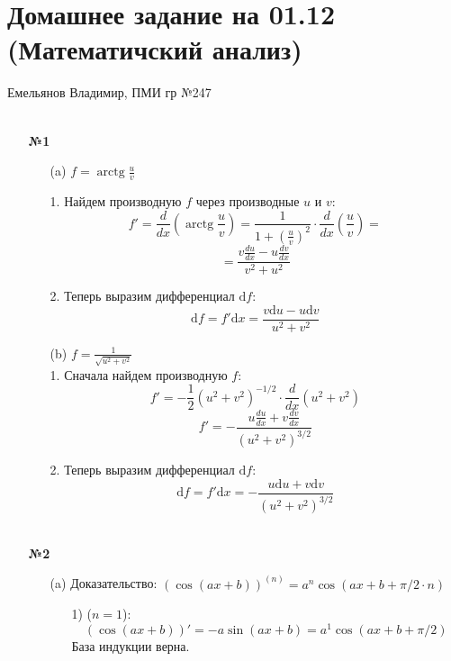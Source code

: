 \documentclass[a4paper]{article}
\begin{document}
\section*{Домашнее задание на 01.12 (Математичский анализ)}
 {\large Емельянов Владимир, ПМИ гр №247}\\\\
\begin{enumerate}
    \item[\textbf{№1}]
    \begin{enumerate}
        \item[(a)] $ f = \operatorname{arctg} \frac{u}{v} $\\
        \item[] 
        1. Найдем производную $ f $ через производные $u$ и $v$:
        $$
        f' = \frac{d}{dx} \left( \operatorname{arctg} \frac{u}{v} \right) = \frac{1}{1 + \left( \frac{u}{v} \right)^2} \cdot \frac{d}{dx} \left( \frac{u}{v} \right) =
        $$
        $$=\frac{v \frac{du}{dx} - u \frac{dv}{dx}}{v^2 + u^2}$$

        2. Теперь выразим дифференциал $ \mathrm{d}f $:
        $$
        \mathrm{d}f = f' \mathrm{d}x = \frac{v \mathrm{d}u - u \mathrm{d}v}{u^2 + v^2}
        $$

        \item[(b)]  $ f = \frac{1}{\sqrt{u^2 + v^2}} $ \\
    
        1. Сначала найдем производную $ f $:
        $$
        f' = -\frac{1}{2} (u^2 + v^2)^{-1/2} \cdot \frac{d}{dx}(u^2 + v^2)
        $$
        $$
        f' = -\frac{u \frac{du}{dx} + v \frac{dv}{dx}}{(u^2 + v^2)^{3/2}}
        $$

        
        2. Теперь выразим дифференциал $ \mathrm{d}f $:
        $$
        \mathrm{d}f = f' \mathrm{d}x = -\frac{u \mathrm{d}u + v \mathrm{d}v}{(u^2 + v^2)^{3/2}}
        $$\\

    \end{enumerate}

    \item[\textbf{№2}]
    \begin{enumerate}
        \item[(a)]Доказательство: $(\cos (a x+b))^{(n)}=a^{n} \cos (a x+b+\pi / 2 \cdot n)$
        \begin{enumerate}
            \item[1)]
             ($n=1$):
            $$
            (\cos (a x + b))' = -a \sin (a x + b) = a^1 \cos (a x + b + \pi/2)
            $$
            База индукции верна.


\end{enumerate}
\end{enumerate}
\end{enumerate}
\end{document}
